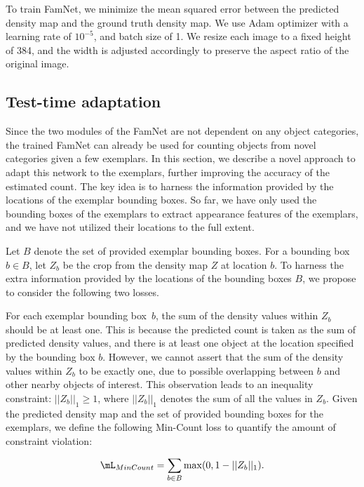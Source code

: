 To train FamNet, we minimize the mean squared error between the predicted density map and the ground truth density map. We use Adam optimizer with a learning rate of $10^{-5}$, and batch size of 1. We resize each image to a fixed height of 384, and the width is adjusted accordingly to preserve the aspect ratio of the original image. 

\subsection{Test-time adaptation}

Since the two modules of the FamNet are not dependent on any object categories, the trained FamNet can already be used for counting objects from novel categories given a few exemplars. In this section, we describe a novel approach to adapt this network to the exemplars, further improving the accuracy of the estimated count. The key idea is to harness the information provided by the locations of the exemplar bounding boxes. So far, we have only used the bounding boxes of the exemplars to extract appearance features of the exemplars, and we have not utilized their locations to the full extent. 

Let $B$ denote the set of provided exemplar bounding boxes. For a bounding box $b \in B$, let $Z_b$ be the crop from the density map $Z$ at location $b$. To harness the extra information provided by the locations of the bounding boxes $B$, we propose to consider the following two losses.

 For each exemplar bounding box~$b$, the sum of the density values within $Z_b$ should be at least one. This is because the predicted count is taken as the sum of predicted density values, and there is at least one object at the location  specified by the bounding box $b$. However, we cannot assert that the sum of the density values within $Z_b$ to be exactly one, due to possible overlapping between $b$ and other nearby objects of interest. This observation leads to an inequality constraint: $||Z_b||_1 \geq 1$, where $||Z_b||_1$ denotes the sum of all the values in $Z_b$. Given the predicted density map and the set of provided bounding boxes for the exemplars, we define the following Min-Count loss to quantify the amount of constraint violation: 

\begin{equation}\label{adaptation1}
\mL_{MinCount} = \sum_{b \in B} \max(0,1- ||Z_b||_1).    
\end{equation}


